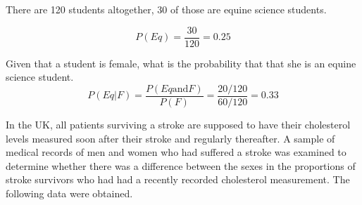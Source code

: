 \documentclass[]{report}
\begin{document}
			There are 120 students altogether, 30 of those are equine science students.
			
			\[P(Eq) = \frac{30}{120}= 0.25\]
			
			Given that a student is female, what is the probability that that she is an equine science student.
			\[P(Eq |F) = \frac{P(Eq \mbox{and} F)}{P(F)}= \frac{20/120}{60/120}= 0.33\]

\newpage




In the UK, all patients surviving a stroke are supposed to have their cholesterol
levels measured soon after their stroke and regularly thereafter. A sample of
medical records of men and women who had suffered a stroke was examined
to determine whether there was a difference between the sexes in the
proportions of stroke survivors who had had a recently recorded cholesterol
measurement. The following data were obtained. 



			
			
\end{document}
